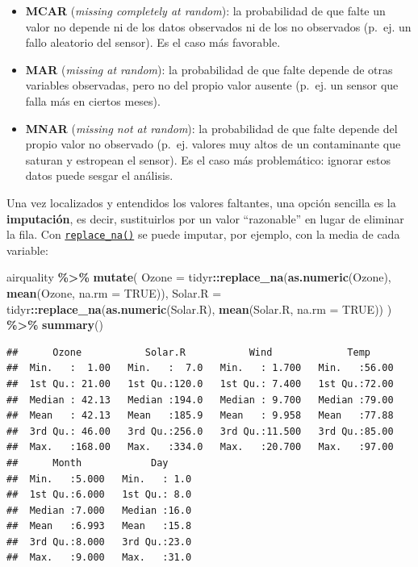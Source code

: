\documentclass[
]{book}
\newenvironment{Shaded}{\begin{snugshade}}{\end{snugshade}}
\newcommand{\AttributeTok}[1]{\textcolor[rgb]{0.13,0.29,0.53}{#1}}
\newcommand{\ConstantTok}[1]{\textcolor[rgb]{0.56,0.35,0.01}{#1}}
\newcommand{\FunctionTok}[1]{\textcolor[rgb]{0.13,0.29,0.53}{\textbf{#1}}}
\newcommand{\NormalTok}[1]{#1}
\newcommand{\SpecialCharTok}[1]{\textcolor[rgb]{0.81,0.36,0.00}{\textbf{#1}}}
\providecommand{\tightlist}{%
  \setlength{\itemsep}{0pt}\setlength{\parskip}{0pt}}
\theoremstyle{break}
\theoremstyle{nonumberplain}
\begin{document}
\begin{itemize}
\tightlist
\item
  \textbf{MCAR} (\emph{missing completely at random}): la probabilidad de que falte un valor no depende ni de los datos observados ni de los no observados (p.~ej. un fallo aleatorio del sensor). Es el caso más favorable.
\item
  \textbf{MAR} (\emph{missing at random}): la probabilidad de que falte depende de otras variables observadas, pero no del propio valor ausente (p.~ej. un sensor que falla más en ciertos meses).
\item
  \textbf{MNAR} (\emph{missing not at random}): la probabilidad de que falte depende del propio valor no observado (p.~ej. valores muy altos de un contaminante que saturan y estropean el sensor). Es el caso más problemático: ignorar estos datos puede sesgar el análisis.
\end{itemize}

Una vez localizados y entendidos los valores faltantes, una opción sencilla es la \textbf{imputación}, es decir, sustituirlos por un valor ``razonable'' en lugar de eliminar la fila. Con \href{https://tidyr.tidyverse.org/reference/replace_na.html}{\texttt{replace\_na()}} se puede imputar, por ejemplo, con la media de cada variable:

\begin{Shaded}
\begin{Highlighting}[]
\NormalTok{airquality }\SpecialCharTok{\%\textgreater{}\%}
  \FunctionTok{mutate}\NormalTok{(}
    \AttributeTok{Ozone =}\NormalTok{ tidyr}\SpecialCharTok{::}\FunctionTok{replace\_na}\NormalTok{(}\FunctionTok{as.numeric}\NormalTok{(Ozone), }\FunctionTok{mean}\NormalTok{(Ozone, }\AttributeTok{na.rm =} \ConstantTok{TRUE}\NormalTok{)),}
    \AttributeTok{Solar.R =}\NormalTok{ tidyr}\SpecialCharTok{::}\FunctionTok{replace\_na}\NormalTok{(}\FunctionTok{as.numeric}\NormalTok{(Solar.R), }\FunctionTok{mean}\NormalTok{(Solar.R, }\AttributeTok{na.rm =} \ConstantTok{TRUE}\NormalTok{))}
\NormalTok{  ) }\SpecialCharTok{\%\textgreater{}\%}
  \FunctionTok{summary}\NormalTok{()}
\end{Highlighting}
\end{Shaded}

\begin{verbatim}
##      Ozone           Solar.R           Wind             Temp      
##  Min.   :  1.00   Min.   :  7.0   Min.   : 1.700   Min.   :56.00  
##  1st Qu.: 21.00   1st Qu.:120.0   1st Qu.: 7.400   1st Qu.:72.00  
##  Median : 42.13   Median :194.0   Median : 9.700   Median :79.00  
##  Mean   : 42.13   Mean   :185.9   Mean   : 9.958   Mean   :77.88  
##  3rd Qu.: 46.00   3rd Qu.:256.0   3rd Qu.:11.500   3rd Qu.:85.00  
##  Max.   :168.00   Max.   :334.0   Max.   :20.700   Max.   :97.00  
##      Month            Day      
##  Min.   :5.000   Min.   : 1.0  
##  1st Qu.:6.000   1st Qu.: 8.0  
##  Median :7.000   Median :16.0  
##  Mean   :6.993   Mean   :15.8  
##  3rd Qu.:8.000   3rd Qu.:23.0  
##  Max.   :9.000   Max.   :31.0
\end{verbatim}
\end{document}
